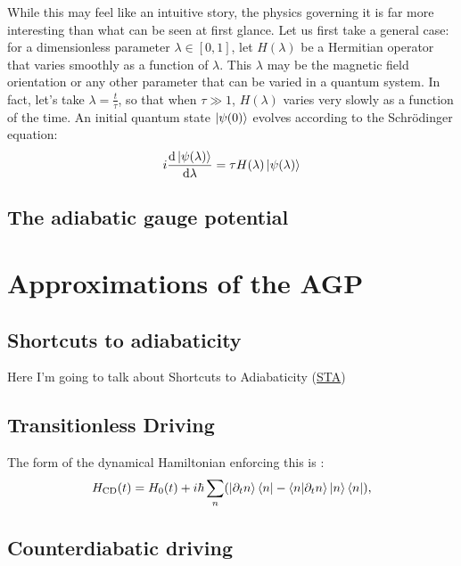         While this may feel like an intuitive story, the physics governing it is far more interesting than what can be seen at first glance. Let us first take a general case: for a dimensionless parameter $\lambda \in [0,1]$, let $H(\lambda)$ be a Hermitian operator that varies smoothly as a function of $\lambda$. This $\lambda$ may be the magnetic field orientation or any other parameter that can be varied in a quantum system. In fact, let's take $\lambda = \frac{t}{\tau}$, so that when $\tau \gg 1$, $H(\lambda)$ varies very slowly as a function of the time.  An initial quantum state $\ket{\psi(0)}$ evolves according to the Schr\"{o}dinger equation:
        \begin{equation}\label{eq:adiabatic_schrodinger}
            i\dv{\ket{\psi(\lambda)}}{\lambda} = \tau H(\lambda)\ket{\psi(\lambda)}
        \end{equation}
        
        \subsection{The adiabatic gauge potential}
        
    \section{Approximations of the AGP}
    
        \subsection{Shortcuts to adiabaticity}
        
        Here I'm going to talk about Shortcuts to Adiabaticity (\hyperref[acr:sta]{STA})
        
        \subsection{Transitionless Driving}
        The form of the dynamical Hamiltonian enforcing this is \cite{berry_transitionless_2009}:
        \begin{equation}\label{eq:counterdiabatic}
            H_{\mathrm{CD}}(t) = H_0 (t) + i\hbar \sum_n (\ket{\partial_t n}\bra{n} - \bra{n}\ket{\partial_t n}\ket{n}\bra{n}),
        \end{equation}
        \subsection{Counterdiabatic driving}

